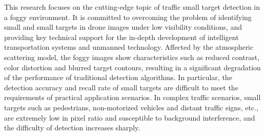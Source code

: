 \begin{enabstract}

This research focuses on the cutting-edge topic of traffic small target detection in a foggy environment. It is committed to overcoming the problem of identifying small and small targets in drone images under low visibility conditions, and providing key technical support for the in-depth development of intelligent transportation systems and unmanned technology. Affected by the atmospheric scattering model, the foggy images show characteristics such as reduced contrast, color distortion and blurred target contours, resulting in a significant degradation of the performance of traditional detection algorithms. In particular, the detection accuracy and recall rate of small targets are difficult to meet the requirements of practical application scenarios. In complex traffic scenarios, small targets such as pedestrians, non-motorized vehicles and distant traffic signs, etc., are extremely low in pixel ratio and susceptible to background interference, and the difficulty of detection increases sharply.


\end{enabstract}
